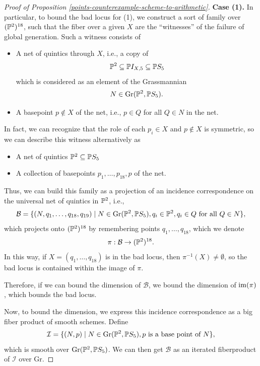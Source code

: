 \documentclass[12pt]{article}
\newcommand{\Gr}{\mathrm{Gr}}
\begin{document}
\begin{itemize}
\begin{proof}[Proof of Proposition \ref{points-counterexample-scheme-to-arithmetic}]
        \textbf{Case (1).} In particular, to bound the bad locus for (1), we construct a sort of family over $(\P^2)^{18}$, such that the fiber over a given $X$ are the ``witnesses'' of the failure of global generation. Such a witness consists of
        \begin{itemize}
            \item A net of quintics through $X$, i.e., a copy of
            \[\P^2 \subseteq \P I_{X,5} \subseteq \P S_5\]
            which is considered as an element of the Grassmannian
            \[N\in \Gr(\P^2,\P S_5).\]
            \item A basepoint $p\not\in X$ of the net, i.e., $p\in Q$ for all $Q\in N$ in the net. 
        \end{itemize}
        In fact, we can recognize that the role of each $p_i\in X$ and $p\not\in X$ is symmetric, so we can describe this witness alternatively as
        \begin{itemize}
            \item A net of quintics $\P^2\subseteq \P S_5$
            \item A collection of basepoints $p_1,\dots,p_{18},p$ of the net.
        \end{itemize}
        Thus, we can build this family as a projection of an incidence correspondence on the universal net of quintics in $\P^2$, i.e.,
        \[\mathcal{B} = \{(N,q_1,\dots,q_{18},q_{19}) \mid N\in \Gr(\P^2,\P S_5), q_i \in \P^2, q_i\in Q \text{ for all } Q\in N\},\]
        which projects onto $(\P^2)^{18}$ by remembering points $q_1,\dots,q_{18}$, which we denote
        \[\pi: \mathcal{B} \to (\P^2)^{18}.\]
        In this way, if $X=(q_1,\dots,q_{18})$ is in the bad locus, then $\pi^{-1}(X) \neq \emptyset$, so the bad locus is contained within the image of $\pi$.

        Therefore, if we can bound the dimension of $\mathcal{B}$, we bound the dimension of $\im(\pi)$, which bounds the bad locus.

        Now, to bound the dimension, we express this incidence correspondence as a big fiber product of smooth schemes. Define
        \[\mathcal{I} = \{(N,p) \mid N\in \Gr(\P^2,\P S_5), p \text{ is a base point of } N\},\]
        which is {\color{red} smooth over} $\Gr(\P^2,\P S_5)$. We can then get $\mathcal{B}$ as an iterated fiberproduct of $\mathcal{I}$ over $\Gr$.
        

\end{proof}
\end{itemize}
\end{document}
